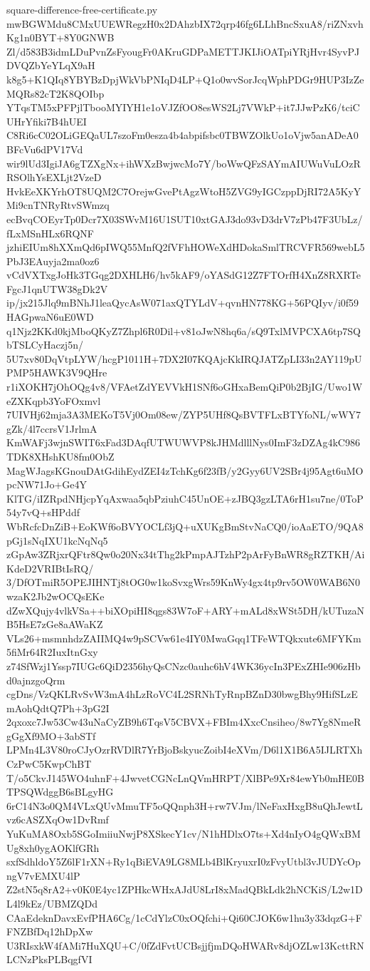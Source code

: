 \documentclass[11pt]{article}
\theoremstyle{definition}
\theoremstyle{remark}
\begin{document}
\begin{filecontents*}[overwrite]{square-difference-free-certificate.py}
mwBGWMdu8CMxUUEWRegzH0x2DAhzbIX72qrp46fg6LLhBncSxuA8/riZNxvhKg1n0BYT+8Y0GNWB
Zl/d583B3idmLDuPvnZsFyougFr0AKruGDPaMETTJKIJiOATpiYRjHvr4SyvPJDVQZbYeYLqX9aH
k8g5+K1QIq8YBYBzDpjWkVbPNIqD4LP+Q1o0wvSorJcqWphPDGr9HUP3IzZeMQRs82cT2K8QOIbp
YTqsTM5xPFPjlTbooMYIYH1e1oVJZfOO8esWS2Lj7VWkP+it7JJwPzK6/tciCUHrYfiki7B4hUEI
C8Ri6cC02OLiGEQaUL7szoFm0esza4b4abpifsbc0TBWZOlkUo1oVjw5anADeA0BFcVu6dPV17Vd
wir9lUd3IgiJA6gTZXgNx+ihWXzBwjwcMo7Y/boWwQFzSAYmAIUWuVuLOzRRSOlhYsEXLjt2VzeD
HvkEeXKYrhOT8UQM2C7OrejwGvePtAgzWtoH5ZVG9yIGCzppDjRI72A5KyYMi9cnTNRyRtvSWmzq
ecBvqCOEyrTp0Dcr7X03SWvM16U1SUT10xtGAJ3do93vD3drV7zPb47F3UbLz/fLxMSnHLx6RQNF
jzhiEIUm8hXXmQd6pIWQ55MnfQ2fVFhHOWeXdHDokaSmlTRCVFR569webL5PbJ3EAuyja2ma0oz6
vCdVXTxgJoHk3TGqg2DXHLH6/hv5kAF9/oYASdG12Z7FTOrfH4XnZ8RXRTeFgcJ1qnUTW38gDk2V
ip/jx215Jlq9mBNhJ1leaQycAsW071axQTYLdV+qvnHN778KG+56PQIyv/i0f59HAGpwaN6uE0WD
q1Njz2KKd0kjMboQKyZ7Zhpl6R0Dil+v81oJwN8hq6a/sQ9TxlMVPCXA6tp7SQbTSLCyHaczj5n/
5U7xv80DqVtpLYW/hcgP1011H+7DX2I07KQAjcKkIRQJATZpLI33n2AY119pUPMP5HAWK3V9QHre
r1iXOKH7jOhOQg4v8/VFAetZdYEVVkH1SNf6oGHxaBemQiP0b2BjIG/Uwo1WeZXKqpb3YoFOxmvl
7UIVHj62mja3A3MEKoT5Vj0Om08ew/ZYP5UHf8QsBVTFLxBTYfoNL/wWY7gZk/4l7ccrsV1JrlmA
KmWAFj3wjnSWIT6xFad3DAqfUTWUWVP8kJHMdlllNys0ImF3zDZAg4kC986TDK8XHshKU8fm0ObZ
MagWJagsKGnouDAtGdihEydZEI4zTchKg6f23fB/y2Gyy6UV2SBr4j95Agt6uMOpcNW71Jo+Ge4Y
KlTG/iIZRpdNHjcpYqAxwaa5qbPziuhC45UnOE+zJBQ3gzLTA6rH1su7ne/0ToP54y7vQ+sHPddf
WbRcfcDnZiB+EoKWf6oBVYOCLf3jQ+uXUKgBmStvNaCQ0/ioAaETO/9QA8pGj1sNqIXU1kcNqNq5
zGpAw3ZRjxrQFtr8Qw0o20Nx34tThg2kPmpAJTzhP2pArFyBnWR8gRZTKH/AiKdeD2VRIBtIsRQ/
3/DfOTmiR5OPEJIHNTj8tOG0w1koSvxgWrs59KnWy4gx4tp9rv5OW0WAB6N0wzaK2Jb2wOCQsEKe
dZwXQujy4vlkVSa++biXOpiHI8qgs83W7oF+ARY+mALd8xWSt5DH/kUTuzaNB5HsE7zGe8aAWaKZ
VLs26+msmnhdzZAIIMQ4w9pSCVw61e4IY0MwaGqq1TFeWTQkxute6MFYKm5fiMr64R2IuxItnGxy
z74SfWzj1Yssp7IUGc6QiD2356hyQsCNzc0auhc6hV4WK36ycIn3PExZHIe906zHbd0ajnzgoQrm
cgDns/VzQKLRvSvW3mA4hLzRoVC4L2SRNhTyRnpBZnD30bwgBhy9HifSLzEmAohQdtQ7Ph+3pG2I
2qxoxc7Jw53Cw43uNaCyZB9h6TqsV5CBVX+FBIm4XxcCnsiheo/8w7Yg8NmeRgGgXf9MO+3abSTf
LPMn4L3V80roCJyOzrRVDlR7YrBjoBskyucZoibI4eXVm/D6l1X1B6A5IJLRTXhCzPwC5KwpChBT
T/o5CkvJ145WO4uhnF+4JwvetCGNcLnQVmHRPT/XlBPe9Xr84ewYb0mHE0BTPSQWdggB6sBLgyHG
6rC14N3o0QM4VLxQUvMmuTF5oQQnph3H+rw7VJm/lNeFaxHxgB8uQhJewtLvz6cASZXqOw1DvRmf
YuKuMA8Oxb5SGoImiiuNwjP8XSkecY1cv/N1hHDlxO7ts+Xd4nIyO4gQWxBMUg8xh0ygAOKlfGRh
sxfSdhldoY5Z6lF1rXN+Ry1qBiEVA9LG8MLb4BlKryuxrI0zFvyUtbl3vJUDYcOpngV7vEMXU4lP
Z2stN5q8rA2+v0K0E4yc1ZPHkcWHxAJdU8LrI8xMadQBkLdk2hNCKiS/L2w1DL4l9kEz/UBMZQDd
CAaEdeknDavxEvfPHA6Cg/1cCdYlzC0xOQfchi+Qi60CJOK6w1hu3y33dqzG+FFNZBfDq12hDpXw
U3RIsxkW4fAMi7HuXQU+C/0fZdFvtUCBsjjfjmDQoHWARv8djOZLw13KcttRNLCNzPksPLBqgfVI

\end{filecontents*}
\end{document}
